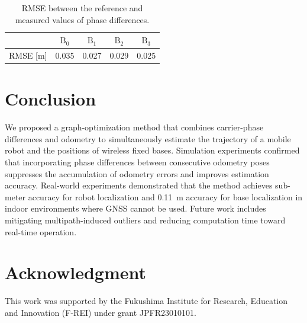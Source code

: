 \documentclass[conference]{IEEEtran}
\begin{document}
\begin{table}[tb]
    \centering
    \caption{RMSE between the reference and measured values of phase differences.}
    \begin{tabular}{ccccc}
    \toprule
         & $\mathrm{B}_0$ & $\mathrm{B}_1$ & $\mathrm{B}_2$ & $\mathrm{B}_3$ \\
    \midrule
     RMSE [m] & 0.035 & 0.027 & 0.029 & 0.025 \\
     \bottomrule
    \end{tabular}
    \label{tab:vicon_vs_wiwi}
\end{table}

\section{Conclusion}
We proposed a graph-optimization method that combines carrier-phase differences and odometry to simultaneously estimate the trajectory of a mobile robot and the positions of wireless fixed bases.
Simulation experiments confirmed that incorporating phase differences between consecutive odometry poses suppresses the accumulation of odometry errors and improves estimation accuracy.
Real-world experiments demonstrated that the method achieves sub-meter accuracy for robot localization and 0.11~m accuracy for base localization in indoor environments where GNSS cannot be used.
Future work includes mitigating multipath-induced outliers and reducing computation time toward real-time operation.

\section*{Acknowledgment}
This work was supported by the Fukushima Institute for Research, Education and Innovation (F-REI) under grant JPFR23010101.



\end{document}
